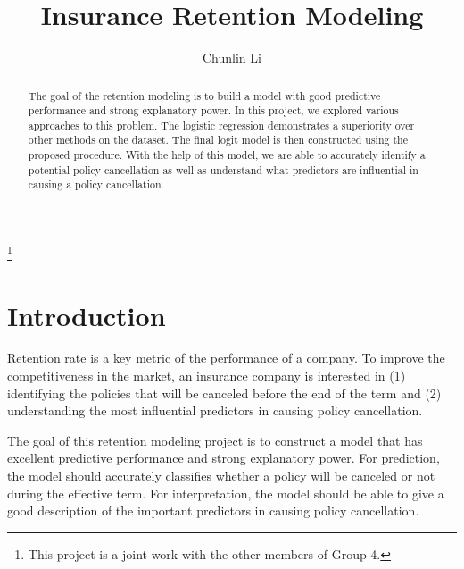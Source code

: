 \documentclass[12pt]{amsart}
\theoremstyle{definition}
\theoremstyle{remark}
\numberwithin{equation}{section}
\let\origmaketitle\maketitle
\def\maketitle{
	\begingroup
	\def\uppercasenonmath##1{} %
	\origmaketitle
	\endgroup
}
\begin{document}
	
	
\title{\large Insurance Retention Modeling }

\author{Chunlin Li}
\thanks{This project is a joint work with the other members of Group 4.}
\date{}
\dedicatory{}
\keywords{}

\begin{abstract}
The goal of the retention modeling is to build a model with good predictive performance and strong explanatory power. In this project, we explored various approaches to this problem. The logistic regression demonstrates a superiority over other methods on the dataset. The final logit model is then constructed using the proposed procedure. With the help of this model, we are able to accurately identify a potential policy cancellation as well as understand what predictors are influential in causing a policy cancellation. 
\end{abstract}

\maketitle


\section{Introduction}

Retention rate is a key metric of the performance of a company. To improve the competitiveness in the market, an insurance company is interested in (1) identifying the policies that will be canceled before the end of the term and (2) understanding the most influential predictors in causing policy cancellation. 

The goal of this retention modeling project is to construct a model that has excellent predictive performance and strong explanatory power. For prediction, the model should accurately classifies whether a policy will be canceled or not during the effective term. For interpretation, the model should be able to give a good description of the important predictors in causing policy cancellation. 
\end{document}
